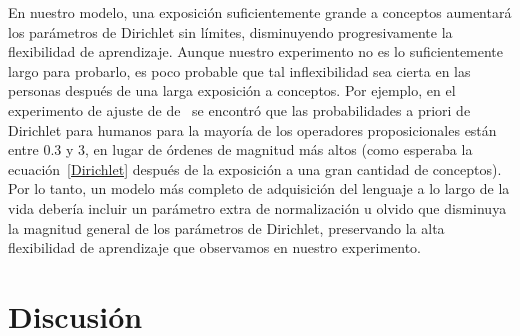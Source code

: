 En nuestro modelo, una exposición suficientemente grande a conceptos aumentará los parámetros de Dirichlet sin límites, disminuyendo progresivamente la flexibilidad de aprendizaje. Aunque nuestro experimento no es lo suficientemente largo para probarlo, es poco probable que tal inflexibilidad sea cierta en las personas después de una larga exposición a conceptos. Por ejemplo, en el experimento de ajuste de \lot de~\cite{piantadosi2016logical} se encontró que las probabilidades a priori de Dirichlet para humanos para la mayoría de los operadores proposicionales están entre $0.3$ y $3$, en lugar de órdenes de magnitud más altos (como esperaba la ecuación~\eqref{Dirichlet} después de la exposición a una gran cantidad de conceptos). Por lo tanto, un modelo más completo de adquisición del lenguaje a lo largo de la vida debería incluir un parámetro extra de normalización u olvido que disminuya la magnitud general de los parámetros de Dirichlet, preservando la alta flexibilidad de aprendizaje que observamos en nuestro experimento.

\section{Discusión}

